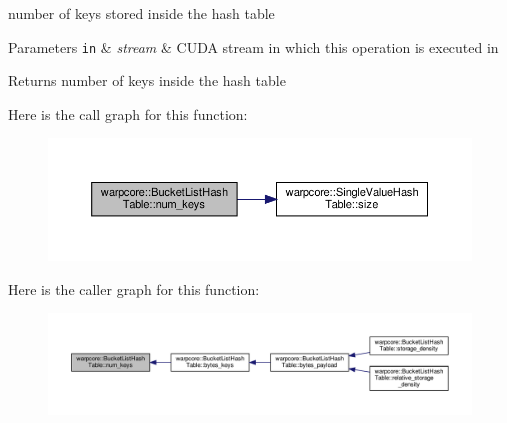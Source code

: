 number of keys stored inside the hash table 


\begin{DoxyParams}[1]{Parameters}
\mbox{\tt in}  & {\em stream} & C\+U\+DA stream in which this operation is executed in \\
\hline
\end{DoxyParams}
\begin{DoxyReturn}{Returns}
number of keys inside the hash table 
\end{DoxyReturn}
Here is the call graph for this function\+:
\nopagebreak
\begin{figure}[H]
\begin{center}
\leavevmode
\includegraphics[width=350pt]{classwarpcore_1_1BucketListHashTable_a6667de3a96ab1e7a1b26461eea6d4144_cgraph}
\end{center}
\end{figure}
Here is the caller graph for this function\+:
\nopagebreak
\begin{figure}[H]
\begin{center}
\leavevmode
\includegraphics[width=350pt]{classwarpcore_1_1BucketListHashTable_a6667de3a96ab1e7a1b26461eea6d4144_icgraph}
\end{center}
\end{figure}
\mbox{\label{classwarpcore_1_1BucketListHashTable_a3c56e0b0e4c7954e65db41e752cd1218}} 
